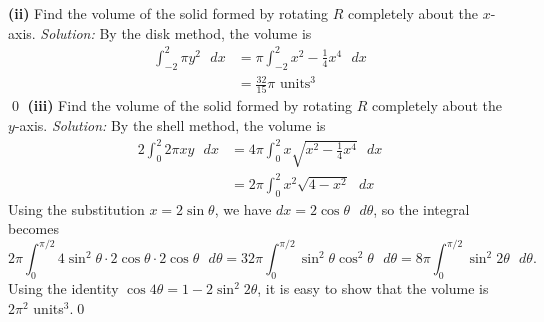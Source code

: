 \documentclass{article}
\begin{document}
\newline\textbf{(ii)} Find the volume of the solid formed by rotating $R$ completely about the $x$-axis.
\newline
\newline\textit{Solution:} By the disk method, the volume is \begin{align*}
    \int_{-2}^{2}\pi y^2\text{ }dx&=\pi\int_{-2}^{2}x^2-\frac{1}{4}x^4\text{ }dx\\
&=\frac{32}{15}\pi\text{ units}^3    
\end{align*} \qed
\newline
\newline\textbf{(iii)} Find the volume of the solid formed by rotating $R$ completely about the $y$-axis.
\newline
\newline\textit{Solution:} By the shell method, the volume is \begin{align*}
    2\int_{0}^{2}2\pi xy\text{ }dx&=4\pi\int_{0}^{2}x\sqrt{x^2-\frac{1}{4}x^4}\text{ }dx\\
&=2\pi\int_{0}^{2}x^2\sqrt{4-x^2}\text{ }dx
\end{align*}
Using the substitution $x=2\operatorname{sin}\theta$, we have $dx=2\operatorname{cos}\theta\text{ }d\theta$, so the integral becomes \[2\pi\int_{0}^{\pi/2}4\operatorname{sin}^2\theta\cdot 2\operatorname{cos}\theta\cdot 2\operatorname{cos}\theta\text{ }d\theta=32\pi\int_{0}^{\pi/2}\operatorname{sin}^2\theta\operatorname{cos}^2\theta\text{ }d\theta=8\pi\int_{0}^{\pi/2}\operatorname{sin}^2 2\theta\text{ }d\theta.\] Using the identity $\operatorname{cos}4\theta=1-2\operatorname{sin}^2 2\theta$, it is easy to show that the volume is $2\pi^2$ units$^3$.\qed 
\newpage
\end{document}
